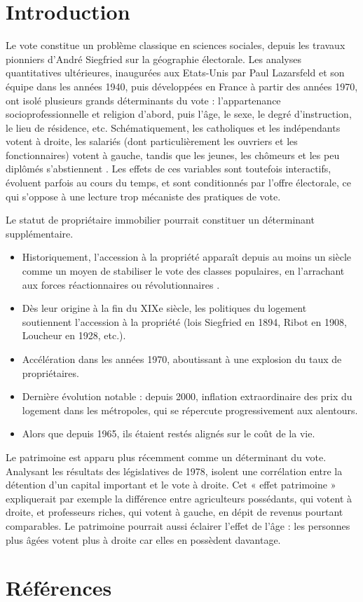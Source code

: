 \documentclass[12pt]{article}
\begin{document}
\section{Introduction}

Le vote constitue un problème classique en sciences sociales, depuis les travaux pionniers d’André Siegfried sur la géographie électorale. Les analyses quantitatives ultérieures, inaugurées aux Etats-Unis par Paul Lazarsfeld et son équipe dans les années 1940, puis développées en France à partir des années 1970, ont isolé plusieurs grands déterminants du vote : l’appartenance socioprofessionnelle et religion d’abord, puis l’âge, le sexe, le degré d’instruction, le lieu de résidence, etc. Schématiquement, les catholiques et les indépendants votent à droite, les salariés (dont particulièrement les ouvriers et les fonctionnaires) votent à gauche, tandis que les jeunes, les chômeurs et les peu diplômés s’abstiennent \cite{douillet_sociologie_2023}. Les effets de ces variables sont toutefois interactifs, évoluent parfois au cours du temps, et sont conditionnés par l’offre électorale, ce qui s’oppose à une lecture trop mécaniste des pratiques de vote.

Le statut de propriétaire immobilier pourrait constituer un déterminant supplémentaire. 
\begin{itemize}
\item Historiquement, l’accession à la propriété apparaît depuis au moins un siècle comme un moyen de stabiliser le vote des classes populaires, en l’arrachant aux forces réactionnaires ou révolutionnaires \cite{michel_cause_2006}.
\item Dès leur origine à la fin du XIXe siècle, les politiques du logement soutiennent l’accession à la propriété (lois Siegfried en 1894, Ribot en 1908, Loucheur en 1928, etc.).
\item Accélération dans les années 1970, aboutissant à une explosion du taux de propriétaires.
\item Dernière évolution notable : depuis 2000, inflation extraordinaire des prix du logement dans les métropoles, qui se répercute progressivement aux alentours.
\item Alors que depuis 1965, ils étaient restés alignés sur le coût de la vie.
\end{itemize}

Le patrimoine est apparu plus récemment comme un déterminant du vote. Analysant les résultats des législatives de 1978, \cite{capdevielle_france_1998} isolent une corrélation entre la détention d’un capital important et le vote à droite. Cet « effet patrimoine » expliquerait par exemple la différence entre agriculteurs possédants, qui votent à droite, et professeurs riches, qui votent à gauche, en dépit de revenus pourtant comparables. Le patrimoine pourrait aussi éclairer l’effet de l’âge : les personnes plus âgées votent plus à droite car elles en possèdent davantage.

\section{Références}

\printbibliography
\end{document}
